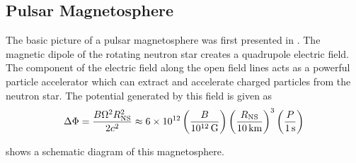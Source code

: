\subsection{Pulsar Magnetosphere}

The basic picture of a pulsar magnetosphere was first presented in
\cite{goldreich_1969_pulsar-electrodynamics}.  The magnetic dipole
of the rotating neutron star creates a quadrupole electric field.
The component of the electric field along the open field lines acts as
a powerful particle accelerator which can extract and accelerate charged
particles from the neutron star. The potential generated
by this field is given as \citep{goldreich_1969_pulsar-electrodynamics}
\begin{equation}
\Delta \Phi = \frac{B \Omega^2 R_\text{NS}^2}{2c^2}
\approx 6\times 10^{12} 
\left(\frac{B}{10^{12}\,\text{G}}\right)
\left(\frac{R_\text{NS}}{10\,\text{km}}\right)^3
\left(\frac{P}{1\,\text{s}}\right)
\end{equation}

 shows a schematic diagram of this
magnetosphere.


